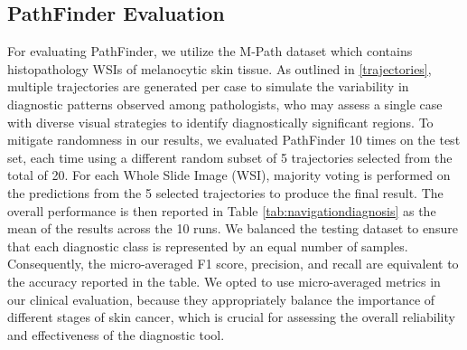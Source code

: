 

\subsection{PathFinder Evaluation}





For evaluating PathFinder, we utilize the M-Path dataset which contains histopathology WSIs of melanocytic skin tissue. As outlined in \ref{trajectories}, multiple trajectories are generated per case to simulate the variability in diagnostic patterns observed among pathologists, who may assess a single case with diverse visual strategies to identify diagnostically significant regions. To mitigate randomness in our results, we evaluated PathFinder 10 times on the test set, each time using a different random subset of 5 trajectories selected from the total of 20. For each Whole Slide Image (WSI), majority voting is performed on the predictions from the 5 selected trajectories to produce the final result. The overall performance is then reported in Table \ref{tab:navigationdiagnosis} as the mean of the results across the 10 runs. We balanced the testing dataset to ensure that each diagnostic class is represented by an equal number of samples. Consequently, the micro-averaged F1 score, precision, and recall are equivalent to the accuracy reported in the table. We opted to use micro-averaged metrics in our clinical evaluation, because they appropriately balance the importance of different stages of skin cancer, which is crucial for assessing the overall reliability and effectiveness of the diagnostic tool. 



